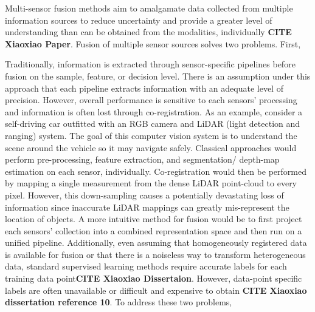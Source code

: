 \newpage
Multi-sensor fusion methods aim to amalgamate data collected from multiple information sources to reduce uncertainty and provide a greater level of understanding than can be obtained from the modalities, individually \textbf{CITE Xiaoxiao Paper}.  Fusion of multiple sensor sources solves two problems.  First, 

Traditionally, information is extracted through sensor-specific pipelines before fusion on the sample, feature, or decision level.  There is an assumption under this approach that each pipeline extracts information with an adequate level of precision.  However, overall performance is sensitive to each sensors' processing and information is often lost through co-registration.  As an example, consider a self-driving car outfitted with an RGB camera and LiDAR (light detection and ranging) system. The goal of this computer vision system is to understand the scene around the vehicle so it may navigate safely.  Classical approaches would perform pre-processing, feature extraction, and segmentation/ depth-map estimation on each sensor, individually.  Co-registration would then be performed by mapping a single measurement from the dense LiDAR point-cloud to every pixel.  However, this down-sampling causes a potentially devastating loss of information since inaccurate LiDAR mappings can greatly mis-represent the location of objects.  A more intuitive method for fusion would be to first project each sensors' collection into a combined representation space and then run on a unified pipeline. 
\newline
Additionally, even assuming that homogeneously registered data is available for fusion or that there is a noiseless way to transform heterogeneous  data, standard supervised learning methods require accurate labels for each training data point\textbf{CITE Xiaoxiao Dissertaion}.  However, data-point specific labels are often unavailable or difficult and expensive to obtain \textbf{CITE Xiaoxiao dissertation reference 10}. 
\newline
To address these two problems,
